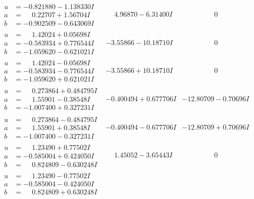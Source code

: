 \documentclass[1p]{elsarticle_modified}
\theoremstyle{definition}
\begin{document}
$$\begin{array}{c|c|c}
\begin{aligned}
u &= -0.821880 - 1.138330 I \\
a &= \phantom{-}0.22707 + 1.56704 I \\
b &= -0.902509 - 0.643069 I\end{aligned}
 & \phantom{-}4.96870 - 6.31400 I & \phantom{-0.000000 } 0 \\ \hline\begin{aligned}
u &= \phantom{-}1.42024 + 0.05698 I \\
a &= -0.583934 + 0.776544 I \\
b &= -1.059620 - 0.621021 I\end{aligned}
 & -3.55866 - 10.18710 I & \phantom{-0.000000 } 0 \\ \hline\begin{aligned}
u &= \phantom{-}1.42024 - 0.05698 I \\
a &= -0.583934 - 0.776544 I \\
b &= -1.059620 + 0.621021 I\end{aligned}
 & -3.55866 + 10.18710 I & \phantom{-0.000000 } 0 \\ \hline\begin{aligned}
u &= \phantom{-}0.273864 + 0.484795 I \\
a &= \phantom{-}1.55901 - 0.38548 I \\
b &= -1.007400 + 0.327231 I\end{aligned}
 & -0.400494 + 0.677706 I & -12.80709 - 0.70696 I \\ \hline\begin{aligned}
u &= \phantom{-}0.273864 - 0.484795 I \\
a &= \phantom{-}1.55901 + 0.38548 I \\
b &= -1.007400 - 0.327231 I\end{aligned}
 & -0.400494 - 0.677706 I & -12.80709 + 0.70696 I \\ \hline\begin{aligned}
u &= \phantom{-}1.23490 + 0.77502 I \\
a &= -0.585004 + 0.424050 I \\
b &= \phantom{-}0.824809 - 0.630248 I\end{aligned}
 & \phantom{-}1.45052 - 3.65443 I & \phantom{-0.000000 } 0 \\ \hline\begin{aligned}
u &= \phantom{-}1.23490 - 0.77502 I \\
a &= -0.585004 - 0.424050 I \\
b &= \phantom{-}0.824809 + 0.630248 I\end{aligned}

\end{array}$$
\end{document}
